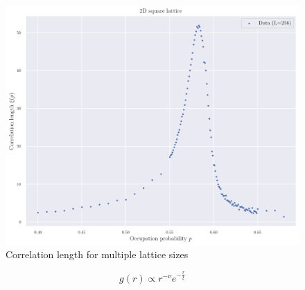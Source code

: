 \begin{figure}[H]
  \includegraphics[width=\linewidth]{Images/sec3_corr_length_1.png}
  \caption{Correlation length for multiple lattice sizes}
  \label{fig:sec3_corr_length_1}
\end{figure}





$$ 
 g(r) \propto r^{-\nu} e^{-\frac{r}{\xi}}
$$ 
